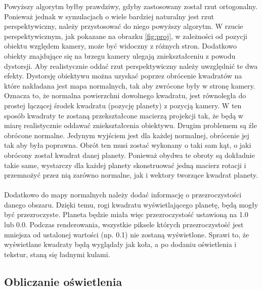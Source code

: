 Powyższy algorytm byłby prawdziwy, gdyby zastosowany został rzut ortogonalny. Ponieważ jednak w symulacjach o wiele bardziej naturalny jest rzut perspektywiczny, należy przystosować do niego powyższy algorytm. W rzucie perspektywicznym, jak pokazane na obrazku \hyperref[fig:proj]{\ref*{fig:proj}}, w zależności od pozycji obiektu względem kamery, może być widoczny z różnych stron. Dodatkowo obiekty znajdujące się na brzegu kamery ulegają zniekształceniu z powodu dystorsji. Aby realistycznie oddać rzut perspektywiczny należy uwzględnić te dwa efekty. Dystorsję obiektywu można uzyskać poprzez obrócenie kwadratów na które nakładana jest mapa normalnych, tak aby zwrócone były w stronę kamery. Oznacza to, że normalna powierzchni dowolnego kwadratu, jest równoległa do prostej łączącej środek kwadratu (pozycję planety) z pozycją kamery. W ten sposób kwadraty te zostaną przekształcone macierzą projekcji tak, że będą w miarę realistycznie oddawać zniekształcenia obiektywu. Drugim problemem są źle obrócone normalne. Jedynym wyjściem jest dla każdej normalnej, obrócenie jej tak aby była poprawna. Obrót ten musi zostać wykonany o taki sam kąt, o jaki obrócony został kwadrat danej planety. Ponieważ obydwa te obroty są dokładnie takie same, wystarczy dla każdej planety skonstruować jedną macierz rotacji i przemnożyć przez nią zarówno normalne, jak i wektory tworzące kwadrat planety.


\paragraph{}

Dodatkowo do mapy normalnych należy dodać informację o przezroczystości danego obszaru. Dzięki temu, rogi kwadratu wyświetlającego planetę, będą mogły być przezroczyste. Planeta będzie miała więc przezroczystość ustawioną na 1.0 lub 0.0. Podczas renderowania, wszystkie piksele których przezroczystość jest mniejsza od ustalonej wartości (np. 0.1) nie zostaną wyświetlone. Sprawi to, że wyświetlane kwadraty będą wyglądały jak koła, a po dodaniu oświetlenia i tekstur, staną się ładnymi kulami.

\subsection{Obliczanie oświetlenia}\label{sub:obliczanie oświetlenia}
\paragraph{}

